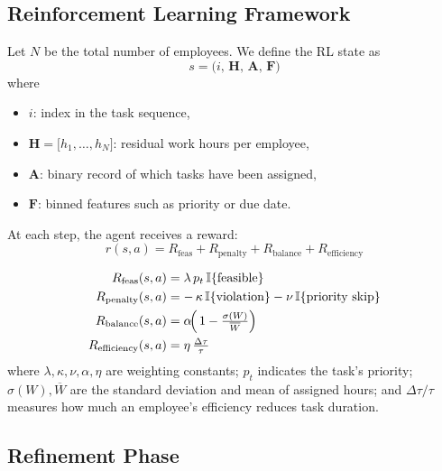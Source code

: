 \documentclass[%
aip,
cp,  %
reprint
]{revtex4-2}
\begin{document}
	\subsection{\label{subsec:rl-framework}Reinforcement Learning Framework}
	
	Let $N$ be the total number of employees. We define the RL state as 
	\begin{equation}
		s = \bigl(i,\,\mathbf{H},\,\mathbf{A},\,\mathbf{F}\bigr)
	\end{equation}
	where 
	\begin{itemize}
		\item $i$: index in the task sequence, 
		\item $\mathbf{H} = \bigl[h_{1}, \dots, h_{N}\bigr]$: residual work hours per employee, 
		\item $\mathbf{A}$: binary record of which tasks have been assigned, 
		\item $\mathbf{F}$: binned features such as priority or due date.
	\end{itemize}
	
	At each step, the agent receives a reward:
	\begin{equation}
		r(s,a) = R_{\text{feas}} + R_{\text{penalty}} + R_{\text{balance}} + R_{\text{efficiency}}
	\end{equation}
	
	\begin{align}
		R_{\text{feas}}(s,a)       & = \lambda\,p_{t}\,\mathbb{I}\{\text{feasible}\}                                     \\
		R_{\text{penalty}}(s,a)    & = -\,\kappa\,\mathbb{I}\{\text{violation}\}-\nu\,\mathbb{I}\{\text{priority skip}\} \\
		R_{\text{balance}}(s,a)    & = \alpha\!\Bigl(\,1-\tfrac{\sigma(W)}{\overline{W}}\Bigr)                           \\
		R_{\text{efficiency}}(s,a) & = \eta\,\tfrac{\Delta\tau}{\tau}                                                    
	\end{align}
	where $\lambda,\kappa,\nu,\alpha,\eta$ are weighting constants; $p_{t}$ indicates the task's priority; $\sigma(W),\overline{W}$ are the standard deviation and mean of assigned hours; and $\Delta\tau/\tau$ measures how much an employee's efficiency reduces task duration.
	
	\subsection{\label{subsec:refinement}Refinement Phase}
	
\end{document}
